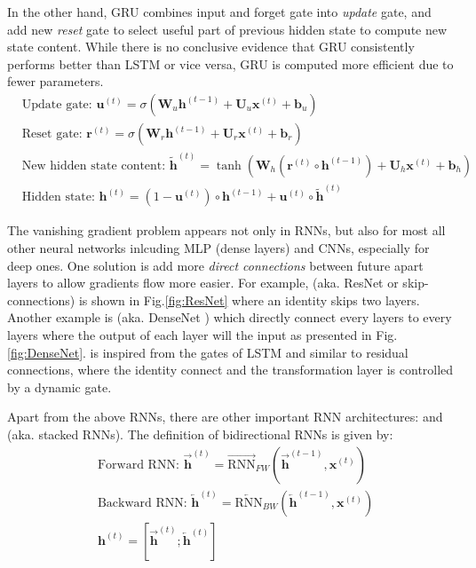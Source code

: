 In the other hand, GRU combines input and forget gate into \emph{update} gate, and add new \emph{reset} gate to select useful part of previous hidden state to compute new state content.
While there is no conclusive evidence that GRU consistently performs better than LSTM or vice versa, GRU is computed more efficient due to fewer parameters.
\begin{align}
&\text{Update gate: } \bm{u}^{(t)} = \sigma (\bm{W}_u \bm{h}^{(t-1)} + \bm{U}_u \bm{x}^{(t)} + \bm{b}_u) \nonumber \\
&\text{Reset gate: } \bm{r}^{(t)} = \sigma (\bm{W}_r \bm{h}^{(t-1)} + \bm{U}_r \bm{x}^{(t)} + \bm{b}_r) \nonumber \\
&\text{New hidden state content: } \tilde{\bm{h}}^{(t)} = \tanh (\bm{W}_h (\bm{r}^{(t)} \circ \bm{h}^{(t-1)}) + \bm{U}_h \bm{x}^{(t)} + \bm{b}_h) \nonumber \\
&\text{Hidden state: } \bm{h}^{(t)} = (1 - \bm{u}^{(t)}) \circ \bm{h}^{(t-1)} + \bm{u}^{(t)} \circ \tilde{\bm{h}}^{(t)} \nonumber
\end{align}

The vanishing gradient problem appears not only in RNNs, but also for most all other neural networks inlcuding MLP (dense layers) and CNNs, especially for deep ones.
One solution is add more \emph{direct connections} between future apart layers to allow gradients flow more easier.
For example,  (aka. ResNet  or skip-connections) is shown in Fig.\ref{fig:ResNet} where an identity skips two layers.
Another example is  (aka. DenseNet ) which directly connect every layers to every layers where the output of each layer will  the input as presented in Fig.\ref{fig:DenseNet}.
 is inspired from the gates of LSTM and similar to residual connections, where the identity connect and the transformation layer is controlled by a dynamic gate.



Apart from the above RNNs, there are other important RNN architectures:  and  (aka. stacked RNNs).
The definition of bidirectional RNNs is given by:
\begin{align}
&\text{Forward RNN: } \overrightarrow{\bm{h}}^{(t)} = \overrightarrow{\text{RNN}}_{FW} (\overrightarrow{\bm{h}}^{(t-1)}, \bm{x}^{(t)}) \nonumber \\
&\text{Backward RNN: } \overleftarrow{\bm{h}}^{(t)} = \overleftarrow{\text{RNN}}_{BW} (\overleftarrow{\bm{h}}^{(t-1)}, \bm{x}^{(t)}) \nonumber \\
&\bm{h}^{(t)} = [\overrightarrow{\bm{h}}^{(t)}; \overleftarrow{\bm{h}}^{(t)}] \nonumber
\end{align}

